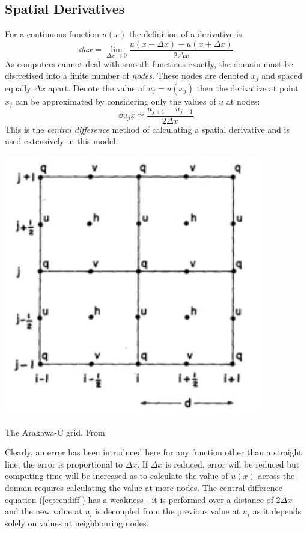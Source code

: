 \documentclass[a4paper, sfsidenotes, twoside]{tufte-handout}
\begin{document}
  \subsection{Spatial Derivatives}
  \label{sub:spatialderivatives}
  For a continuous function $u(x)$ the definition of a derivative is
  \begin{equation}
    \label{}
    \dd{u}{x} = \lim_{\Delta x \to 0} \frac{u(x - \Delta x) - u(x + \Delta x)}{2 \Delta x}
  \end{equation}
  As computers cannot deal with smooth functions exactly, the domain must be discretised into a finite number of \emph{nodes}.
  These nodes are denoted $x_j$ and spaced equally $\Delta x$ apart.
  Denote the value of $u_j = u(x_j)$ then the derivative at point $x_j$ can be approximated by considering only the values of $u$ at nodes:
  \begin{equation}
    \label{eq:cendiff}
    \dd{u_j}{x} \simeq \frac{u_{j+1} - u_{j-1}}{2 \Delta x}
  \end{equation}
  This is the \emph{central difference} method of calculating a spatial derivative and is used extensively in this model.
  \begin{marginfigure}
    \includegraphics{cgrid}
    \caption{The Arakawa-C grid. From \citep{Arakawa:1981bx}}
    \label{fig:cgrid}
  \end{marginfigure}
  Clearly, an error has been introduced here for any function other than a
  straight line, the error is proportional to $\Delta x$.
  If $\Delta x$ is reduced, error will be reduced but computing time will be
  increased as to calculate the value of $u(x)$ across the domain requires
  calculating the value at more nodes.
  The central-difference equation (\ref{eq:cendiff}) has a weakness - it is
  performed over a distance of $2 \Delta x$ and the new value at $u_i$ is
  decoupled from the previous value at $u_i$ as it depends solely on
  values at neighbouring nodes.
\end{document}

